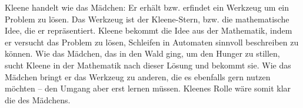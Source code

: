 \documentclass{article}
\begin{document}
Kleene handelt wie das Mädchen: Er erhält bzw. erfindet ein Werkzeug um ein Problem zu lösen. Das Werkzeug ist der Kleene-Stern, bzw. die mathematische Idee, die er repräsentiert. Kleene bekommt die Idee aus der Mathematik, indem er versucht das Problem zu lösen, Schleifen in Automaten sinnvoll beschreiben zu können. Wie das Mädchen, das in den Wald ging, um den Hunger zu stillen, sucht Kleene in der Mathematik nach dieser Lösung und bekommt sie. Wie das Mädchen bringt er das Werkzeug zu anderen, die es ebenfalls gern nutzen möchten -- den Umgang aber erst lernen müssen. Kleenes Rolle wäre somit klar die des Mädchens.
\end{document}
